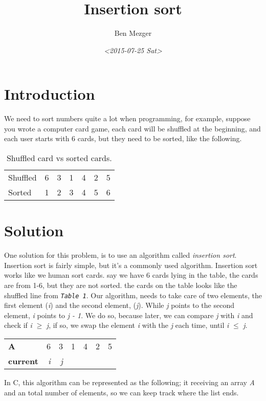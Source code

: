 \documentclass[11pt]{article}
\author{Ben Mezger}
\date{\textit{<2015-07-25 Sat>}}
\title{Insertion sort}
\begin{document}
\maketitle

\section{Introduction}
\label{sec-1}
We need to sort numbers quite a lot when programming, for example, suppose you
wrote a computer card game, each card will be shuffled at the beginning, and
each user starts with 6 cards, but they need to be sorted, like the following.

\begin{table}[htb]
\caption{\label{fig:-ss-cards}Shuffled card vs sorted cards.}
\centering
\begin{tabular}{lrrrrrr}
Shuffled & 6 & 3 & 1 & 4 & 2 & 5\\
Sorted & 1 & 2 & 3 & 4 & 5 & 6\\
\end{tabular}
\end{table}

\section{Solution}
\label{sec-2}

One solution for this problem, is to use an algorithm called \emph{insertion
sort}. Insertion sort is fairly simple, but it's a commonly used algorithm. Insertion
sort works like we human sort cards. say we have 6 cards lying in the table,
the cards are from 1-6, but they are not sorted. the cards on the table looks
like the shuffled line from \texttt{\emph{Table 1}}. Our algorithm, needs to take care of two
elements, the first element (\emph{i}) and the second element, (\emph{j}). While \emph{j}
points to the second element, \emph{i} points to \emph{j - 1}. We do so, because later, we
can compare \emph{j} with \emph{i} and check if \emph{i} $\ge$ \emph{j}, if so, we swap the element
\emph{i} with the \emph{j} each time, until \emph{i} $\le$ \emph{j}.

\begin{center}
\begin{tabular}{lrrrrrr}
\textbf{A} & 6 & 3 & 1 & 4 & 2 & 5\\
\textbf{current} & \emph{i} & \emph{j} &  &  &  & \\
\end{tabular}
\end{center}
\newline
In C, this algorithm can be represented as the following; it receiving an array \emph{A}
and an total number of elements, so we can keep track where the list ends. 
\end{document}
